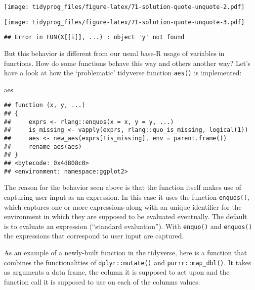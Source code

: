 \documentclass[]{book}
\newenvironment{Shaded}{\begin{snugshade}}{\end{snugshade}}
\newcommand{\KeywordTok}[1]{\textcolor[rgb]{0.13,0.29,0.53}{\textbf{#1}}}
\newcommand{\NormalTok}[1]{#1}
\newcommand{\OperatorTok}[1]{\textcolor[rgb]{0.81,0.36,0.00}{\textbf{#1}}}
\newcommand{\StringTok}[1]{\textcolor[rgb]{0.31,0.60,0.02}{#1}}
\begin{document}
\texttt{[image: tidyprog\_files/figure-latex/71-solution-quote-unquote-2.pdf]}

\begin{Shaded}
\end{Shaded}

\texttt{[image: tidyprog\_files/figure-latex/71-solution-quote-unquote-3.pdf]}

\begin{verbatim}
## Error in FUN(X[[i]], ...) : object 'y' not found
\end{verbatim}

But this behavior is different from our usual base-R usage of variables in functions.
How do some functions behave this way and others another way?
Let's have a look at how the `problematic' tidyverse function \texttt{aes()} is implemented:

\begin{Shaded}
\begin{Highlighting}[]
\NormalTok{aes}
\end{Highlighting}
\end{Shaded}

\begin{verbatim}
## function (x, y, ...) 
## {
##     exprs <- rlang::enquos(x = x, y = y, ...)
##     is_missing <- vapply(exprs, rlang::quo_is_missing, logical(1))
##     aes <- new_aes(exprs[!is_missing], env = parent.frame())
##     rename_aes(aes)
## }
## <bytecode: 0x4d808c0>
## <environment: namespace:ggplot2>
\end{verbatim}

The reason for the behavior seen above is that the function itself makes use of capturing user input as an expression.
In this case it uses the function \texttt{enquos()}, which captures one or more expressions along with an unique identifier for the environment in which they are supposed to be evaluated eventually.
The default is to evaluate an expression (``standard evaluation'').
With \texttt{enquo()} and \texttt{enquos()} the expressions that correspond to user input are captured.

As an example of a newly-built function in the tidyverse, here is a function that combines the functionalities of \texttt{dplyr::mutate()} and \texttt{purrr::map\_dbl()}.
It takes as arguments a data frame, the column it is supposed to act upon and the function call it is supposed to use on each of the columns values:
\end{document}
